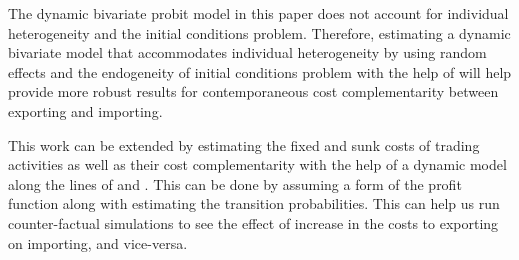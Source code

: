 \documentclass[12pt]{article}
\begin{document}
The dynamic bivariate probit model in this paper does not account for
individual heterogeneity and the initial conditions
problem. Therefore, estimating a dynamic bivariate model that
accommodates individual heterogeneity by using random effects and the
endogeneity of initial conditions problem with the help of
\textcite{wooldridge2005simple} will help provide more robust
results for contemporaneous cost complementarity between exporting and
importing. 

This work can be extended by estimating the fixed and sunk
costs of trading activities as well as their cost
complementarity with the help of a dynamic model along the lines of
\textcite{kasahara2013productivity} and \textcite{aw2011}. This can be
done by assuming a form of the profit function along with estimating
the transition probabilities. This can
help us run  counter-factual 
simulations to see the effect of increase in the
costs to exporting on importing, and vice-versa.  
\end{document}
